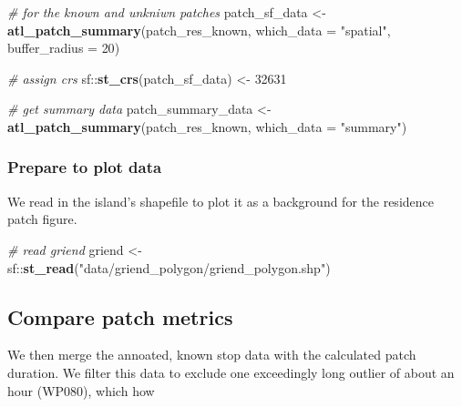 \documentclass[]{scrartcl}
\newenvironment{Shaded}{}{}
\newcommand{\CommentTok}[1]{\textcolor[rgb]{0.38,0.63,0.69}{\textit{#1}}}
\newcommand{\DataTypeTok}[1]{\textcolor[rgb]{0.56,0.13,0.00}{#1}}
\newcommand{\DecValTok}[1]{\textcolor[rgb]{0.25,0.63,0.44}{#1}}
\newcommand{\KeywordTok}[1]{\textcolor[rgb]{0.00,0.44,0.13}{\textbf{#1}}}
\newcommand{\NormalTok}[1]{#1}
\newcommand{\OperatorTok}[1]{\textcolor[rgb]{0.40,0.40,0.40}{#1}}
\newcommand{\StringTok}[1]{\textcolor[rgb]{0.25,0.44,0.63}{#1}}
\begin{document}
\begin{Shaded}
\begin{Highlighting}[]
\CommentTok{# for the known and unkniwn patches}
\NormalTok{patch_sf_data <-}\StringTok{ }\KeywordTok{atl_patch_summary}\NormalTok{(patch_res_known, }
                                   \DataTypeTok{which_data =} \StringTok{"spatial"}\NormalTok{,}
                                   \DataTypeTok{buffer_radius =} \DecValTok{20}\NormalTok{)}

\CommentTok{# assign crs}
\NormalTok{sf}\OperatorTok{::}\KeywordTok{st_crs}\NormalTok{(patch_sf_data) <-}\StringTok{ }\DecValTok{32631}

\CommentTok{# get summary data}
\NormalTok{patch_summary_data <-}\StringTok{ }\KeywordTok{atl_patch_summary}\NormalTok{(patch_res_known, }
                                        \DataTypeTok{which_data =} \StringTok{"summary"}\NormalTok{)}
\end{Highlighting}
\end{Shaded}

\hypertarget{prepare-to-plot-data}{%
\subsubsection{Prepare to plot data}\label{prepare-to-plot-data}}

We read in the island's shapefile to plot it as a background for the residence patch figure.

\begin{Shaded}
\begin{Highlighting}[]
\CommentTok{# read griend}
\NormalTok{griend <-}\StringTok{ }\NormalTok{sf}\OperatorTok{::}\KeywordTok{st_read}\NormalTok{(}\StringTok{"data/griend_polygon/griend_polygon.shp"}\NormalTok{)}
\end{Highlighting}
\end{Shaded}

\hypertarget{compare-patch-metrics}{%
\subsection{Compare patch metrics}\label{compare-patch-metrics}}

We then merge the annoated, known stop data with the calculated patch duration.
We filter this data to exclude one exceedingly long outlier of about an hour (WP080), which how
\end{document}
